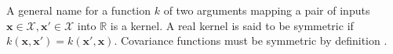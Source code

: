 \documentclass[../../../main.tex]{subfiles}
\begin{document}
A general name for a function $k$ of two arguments mapping a pair of inputs $\bm{x}\in\mathcal{X},\bm{x}'\in\mathcal{X}$ into $\mathbb{R}$ is a kernel. A real kernel is said to be symmetric if $k(\bm{x},\bm{x}')=k(\bm{x}',\bm{x})$. Covariance functions must be symmetric by definition \autocite{Rasmussen2005}.
\end{document}
